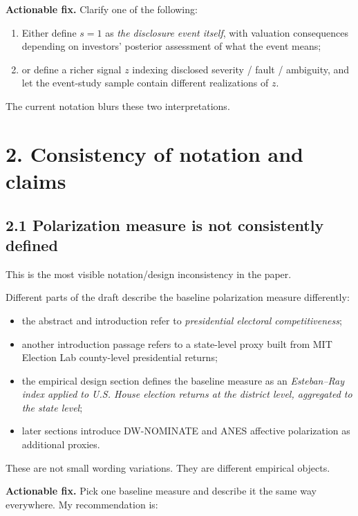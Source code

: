 \documentclass[11pt]{article}
\begin{document}
\textbf{Actionable fix.} Clarify one of the following:

\begin{enumerate}[leftmargin=1.5em]
    \item Either define $s=1$ as \emph{the disclosure event itself}, with valuation consequences depending on investors' posterior assessment of what the event means;
    \item or define a richer signal $z$ indexing disclosed severity / fault / ambiguity, and let the event-study sample contain different realizations of $z$.
\end{enumerate}

The current notation blurs these two interpretations.

\section*{2. Consistency of notation and claims}

\subsection*{2.1 Polarization measure is not consistently defined}

This is the most visible notation/design inconsistency in the paper.

Different parts of the draft describe the baseline polarization measure differently:

\begin{itemize}[leftmargin=1.5em]
    \item the abstract and introduction refer to \emph{presidential electoral competitiveness};
    \item another introduction passage refers to a state-level proxy built from MIT Election Lab county-level presidential returns;
    \item the empirical design section defines the baseline measure as an \emph{Esteban--Ray index applied to U.S. House election returns at the district level, aggregated to the state level};
    \item later sections introduce DW-NOMINATE and ANES affective polarization as additional proxies.
\end{itemize}

These are not small wording variations. They are different empirical objects.

\textbf{Actionable fix.} Pick one baseline measure and describe it the same way everywhere. My recommendation is:
\end{document}
